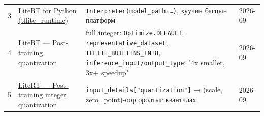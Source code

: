 \begin{longtable}[]{@{}llll@{}}
\begin{minipage}[t]{0.22\columnwidth}
3\strut
\end{minipage} & \begin{minipage}[t]{0.22\columnwidth}\raggedright
\href{https://ai.google.dev/edge/litert/microcontrollers/python}{LiteRT for Python (tflite\_\allowbreak{}runtime)}\strut
\end{minipage} & \begin{minipage}[t]{0.22\columnwidth}\raggedright
\texttt{Interpreter(model\_\allowbreak{}path=\allowbreak{}\ldots{})}, хуучин багцын платформ\strut
\end{minipage} & \begin{minipage}[t]{0.22\columnwidth}\raggedright
2026-09\strut
\end{minipage}\tabularnewline
\begin{minipage}[t]{0.22\columnwidth}\raggedright
4\strut
\end{minipage} & \begin{minipage}[t]{0.22\columnwidth}\raggedright
\href{https://ai.google.dev/edge/litert/conversion/tensorflow/quantization/post_training_quantization}{LiteRT --- Post-training quantization}\strut
\end{minipage} & \begin{minipage}[t]{0.22\columnwidth}\raggedright
full integer: \texttt{Optimize.DEFAULT}, \texttt{representative\_\allowbreak{}dataset}, \texttt{TFLITE\_\allowbreak{}BUILTINS\_\allowbreak{}INT8}, \texttt{inference\_\allowbreak{}input/\allowbreak{}output\_\allowbreak{}type}; "4x smaller, 3x+ speedup"\strut
\end{minipage} & \begin{minipage}[t]{0.22\columnwidth}\raggedright
2026-09\strut
\end{minipage}\tabularnewline
\begin{minipage}[t]{0.22\columnwidth}\raggedright
5\strut
\end{minipage} & \begin{minipage}[t]{0.22\columnwidth}\raggedright
\href{https://ai.google.dev/edge/litert/conversion/tensorflow/quantization/post_training_integer_quant}{LiteRT --- Post-training integer quantization}\strut
\end{minipage} & \begin{minipage}[t]{0.22\columnwidth}\raggedright
\texttt{input\_\allowbreak{}details{[}"quantization"{]}} → (scale, zero\_point)-оор оролтыг квантчлах\strut
\end{minipage} & \begin{minipage}[t]{0.22\columnwidth}\raggedright
2026-09\strut

\end{minipage}
\end{longtable}

